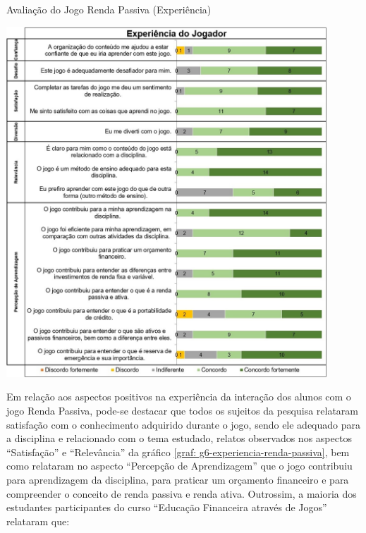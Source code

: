 \graphicspath{{graficos/}} 
\begin{grafico}[!ht]
\centering
\begin{minipage}{0.9\textwidth}
\caption{Avaliação do Jogo Renda Passiva (Experiência)}
\centering
\includegraphics[width=0.9\textwidth]{g6-experiencia-renda-passiva}
\label{graf: g6-experiencia-renda-passiva}
\end{minipage}
\end{grafico}

\newpage
Em relação aos aspectos positivos na experiência da interação dos alunos com o jogo Renda Passiva, pode-se destacar que todos os sujeitos da pesquisa relataram satisfação com o conhecimento adquirido durante o jogo, sendo ele adequado para a disciplina e relacionado com o tema estudado, relatos observados nos aspectos “Satisfação” e “Relevância” da gráfico \ref{graf: g6-experiencia-renda-passiva}, bem como relataram no aspecto “Percepção de Aprendizagem” que o jogo contribuiu para aprendizagem da disciplina, para praticar um orçamento financeiro e para compreender o conceito de renda passiva e renda ativa. Outrossim, a maioria dos estudantes participantes do curso “Educação Financeira através de Jogos” relataram que:

